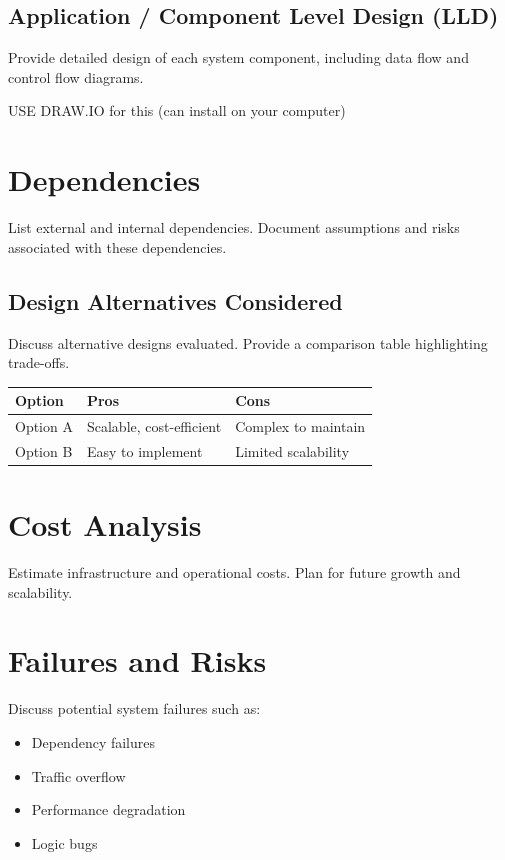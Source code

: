 \documentclass[12pt,a4paper]{article}
\begin{document}
\subsection{Application / Component Level Design (LLD)}
Provide detailed design of each system component, including data flow and control flow diagrams.

USE DRAW.IO for this (can install on your computer)

\newpage
\section{Dependencies}
List external and internal dependencies.  
Document assumptions and risks associated with these dependencies.
\subsection{Design Alternatives Considered}
Discuss alternative designs evaluated.  
Provide a comparison table highlighting trade-offs.

\begin{longtable}{@{}p{3cm}p{5cm}p{5cm}@{}}
\toprule
\textbf{Option} & \textbf{Pros} & \textbf{Cons} \\ \midrule
Option A & Scalable, cost-efficient & Complex to maintain \\
Option B & Easy to implement & Limited scalability \\ \bottomrule
\end{longtable}

\newpage
\section{Cost Analysis}
Estimate infrastructure and operational costs.  
Plan for future growth and scalability.

\newpage
\section{Failures and Risks}
Discuss potential system failures such as:
\begin{itemize}
  \item Dependency failures
  \item Traffic overflow
  \item Performance degradation
  \item Logic bugs
\end{itemize}
\end{document}
